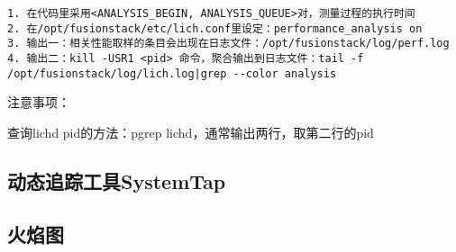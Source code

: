 \begin{lstlisting}
1. 在代码里采用<ANALYSIS_BEGIN, ANALYSIS_QUEUE>对，测量过程的执行时间
2. 在/opt/fusionstack/etc/lich.conf里设定：performance_analysis on
3. 输出一：相关性能取样的条目会出现在日志文件：/opt/fusionstack/log/perf.log
4. 输出二：kill -USR1 <pid> 命令，聚合输出到日志文件：tail -f /opt/fusionstack/log/lich.log|grep --color analysis
\end{lstlisting}

注意事项：
\begin{compactenum}
\item 查询lichd pid的方法：pgrep lichd，通常输出两行，取第二行的pid
\end{compactenum}

\subsection{动态追踪工具SystemTap}



\subsection{火焰图}
